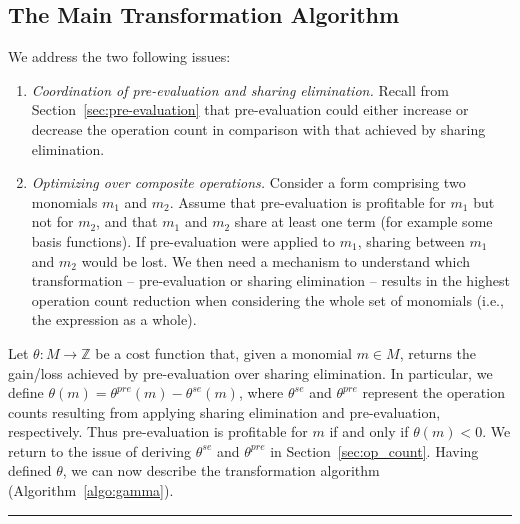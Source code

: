 \subsection{The Main Transformation Algorithm}
We address the two following issues: 
\begin{enumerate}
\item \textit{Coordination of pre-evaluation and sharing elimination.} Recall from Section~\ref{sec:pre-evaluation} that pre-evaluation could either increase or decrease the operation count in comparison with that achieved by sharing elimination.
\item \textit{Optimizing over composite operations.} Consider a form comprising two monomials $m_1$ and $m_2$. Assume that pre-evaluation is profitable for $m_1$ but not for $m_2$, and that $m_1$ and $m_2$ share at least one term (for example some basis functions). If pre-evaluation were applied to $m_1$, sharing between $m_1$ and $m_2$ would be lost. We then need a mechanism to understand which transformation -- pre-evaluation or sharing elimination -- results in the highest operation count reduction when considering the whole set of monomials (i.e., the expression as a whole).
\end{enumerate}

Let $\theta : M \rightarrow \mathbb{Z}$ be a cost function that, given a monomial $m \in M$, returns the gain/loss achieved by pre-evaluation over sharing elimination. In particular, we define $\theta(m) = \theta^{pre}(m) - \theta^{se}(m)$, where $\theta^{se}$ and $\theta^{pre}$ represent the operation counts resulting from applying sharing elimination and pre-evaluation, respectively. Thus pre-evaluation is profitable for $m$ if and only if $\theta(m) < 0$. We return to the issue of deriving $\theta^{se}$ and $\theta^{pre}$ in Section~\ref{sec:op_count}. Having defined $\theta$, we can now describe the transformation algorithm (Algorithm~\ref{algo:gamma}).

\noindent\rule[0.01ex]{\linewidth}{0.7pt}

